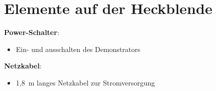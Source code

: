 %
%

\chapter{Elemente auf der Heckblende}
	
\begin{figure}[htb]
	\begin{center}
		
		\label{Heckblende}
	\end{center}
\end{figure}
\textbf{Power-Schalter}: 
\begin{itemize}
	\item Ein- und ausschalten des Demonstrators
\end{itemize}


\textbf{Netzkabel}: 
\begin{itemize}
	\item 1,8\ m langes Netzkabel zur Stromversorgung
\end{itemize}
